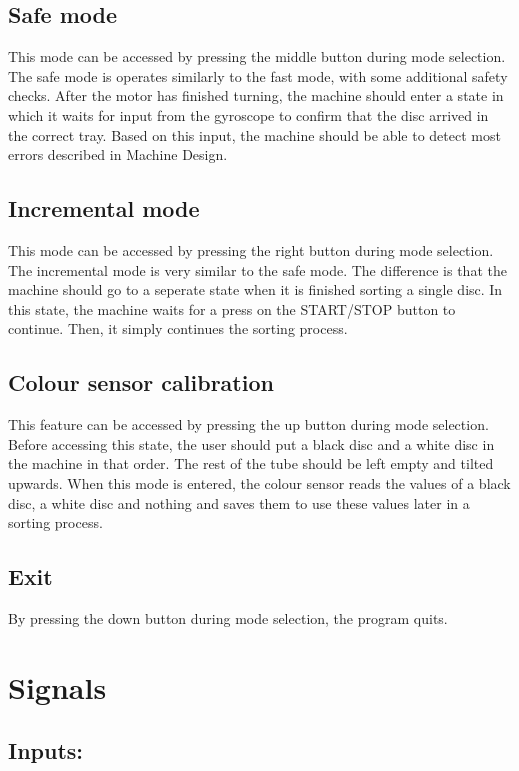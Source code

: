\documentclass[a4paper,oneside,11pt]{article}
\begin{document}
\newpage

\subsection{Safe mode}
This mode can be accessed by pressing the middle button during mode selection. The safe mode is operates similarly to the fast mode, with some additional safety checks. After the motor has finished turning, the machine should enter a state in which it waits for input from the gyroscope to confirm that the disc arrived in the correct tray. Based on this input, the machine should be able to detect most errors described in Machine Design. 

\subsection{Incremental mode}
This mode can be accessed by pressing the right button during mode selection. The incremental mode is very similar to the safe mode. The difference is that the machine should go to a seperate state when it is finished sorting a single disc. In this state, the machine waits for a press on the START/STOP button to continue. Then, it simply continues the sorting process.

\subsection{Colour sensor calibration}
This feature can be accessed by pressing the up button during mode selection. Before accessing this state, the user should put a black disc and a white disc in the machine in that order. The rest of the tube should be left empty and tilted upwards. When this mode is entered, the colour sensor reads the values of a black disc, a white disc and nothing and saves them to use these values later in a sorting process.

\subsection{Exit}
By pressing the down button during mode selection, the program quits.

\section{Signals}
\subsection{Inputs:}
\end{document}
